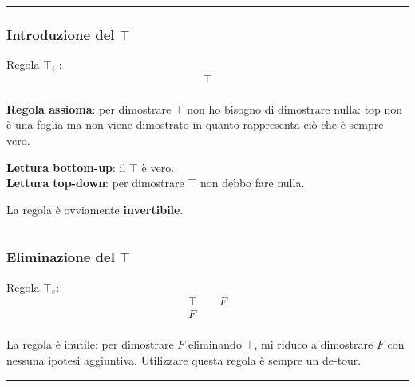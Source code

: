 \documentclass[
  a4paper,
]{article}
\begin{document}
\par\noindent\rule{\linewidth}{0.4pt}\par\vspace{6pt}

\hypertarget{introduzione-del-top}{%
\subsubsection{\texorpdfstring{Introduzione del
\(\top\)}{Introduzione del \textbackslash top}}\label{introduzione-del-top}}

Regola \(\top_i\) : \[
\begin{matrix} 
\hline
\top \\
\end{matrix}
\]

\textbf{Regola assioma}: per dimostrare \(\top\) non ho bisogno di
dimostrare nulla: top non è una foglia ma non viene dimostrato in quanto
rappresenta ciò che è sempre vero.

\textbf{Lettura bottom-up}: il \(\top\) è vero.\\
\textbf{Lettura top-down}: per dimostrare \(\top\) non debbo fare nulla.

La regola è ovviamente \textbf{invertibile}.

\par\noindent\rule{\linewidth}{0.4pt}\par\vspace{6pt}

\hypertarget{eliminazione-del-top}{%
\subsubsection{\texorpdfstring{Eliminazione del
\(\top\)}{Eliminazione del \textbackslash top}}\label{eliminazione-del-top}}

Regola \(\top_e\): \[
\begin{matrix} 
\top \quad\quad F \\
\hline
F \\
\end{matrix}
\]

La regola è inutile: per dimostrare \(F\) eliminando \(\top\), mi riduco
a dimostrare \(F\) con nessuna ipotesi aggiuntiva. Utilizzare questa
regola è sempre un de-tour.

\par\noindent\rule{\linewidth}{0.4pt}\par\vspace{6pt}
\end{document}
